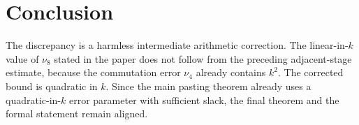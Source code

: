 \documentclass[11pt]{article}
\begin{document}
\section{Conclusion}

The discrepancy is a harmless intermediate arithmetic correction. The
linear-in-$k$ value of $\nu_8$ stated in the paper does not follow from the
preceding adjacent-stage estimate, because the commutation error $\nu_4$
already contains $k^2$. The corrected bound is quadratic in $k$. Since the
main pasting theorem already uses a quadratic-in-$k$ error parameter with
sufficient slack, the final theorem and the formal statement remain aligned.



\end{document}
